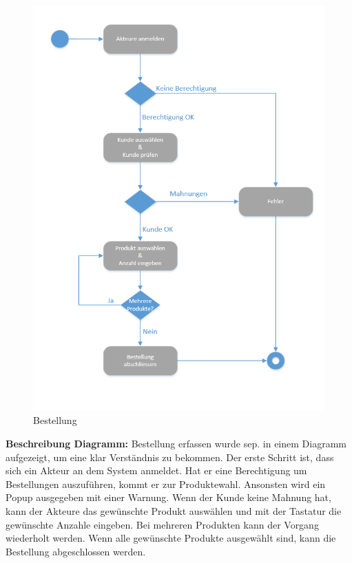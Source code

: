 \begin{figure}[H]
\centering
	\includegraphics[width=0.7\linewidth]{Images/Bestellung}
	\caption{Bestellung}
	\label{fig:kontextdiagram}
\end{figure}
\textbf{Beschreibung Diagramm:}
Bestellung erfassen wurde sep. in einem Diagramm aufgezeigt, um eine klar Verständnis zu bekommen. Der erste Schritt ist, dass sich ein Akteur an dem System anmeldet. Hat er eine Berechtigung um Bestellungen auszuführen, kommt er zur Produktewahl. Ansonsten wird ein Popup ausgegeben mit einer Warnung. 
Wenn der Kunde keine Mahnung hat, kann der Akteure das gewünschte Produkt auswählen und mit der Tastatur die gewünschte Anzahle eingeben. Bei mehreren Produkten kann der Vorgang wiederholt werden. Wenn alle gewünschte Produkte ausgewählt sind, kann die Bestellung abgeschlossen werden.








